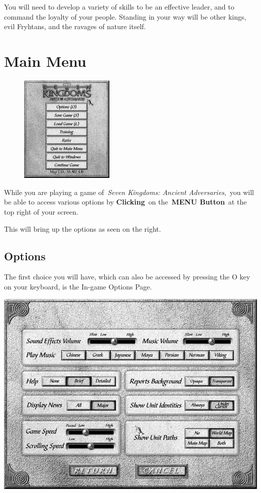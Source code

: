 You will need to develop a variety of skills to be an effective leader, and to command the loyalty of your people. Standing in your way will be other kings, evil Fryhtans, and the ravages of nature itself.

\section{Main Menu}

\begin{figure}
	\begin{center}
		\vspace{-20pt}
		\includegraphics[width=0.4\textwidth]{Imainmenu}
	\end{center}
	\vspace{-20pt}
\end{figure}

While you are playing a game of \textit{Seven Kingdoms: Ancient Adversaries}, you will be able to access various options by \textbf{Clicking} on the \textbf{MENU Button} at the top right of your screen.

This will bring up the options as seen on the right.

\clearpage %

\subsection{Options}

The first choice you will have, which can also be accessed by pressing the O key on your keyboard, is the In-game Options Page.

\begin{center}
	\includegraphics[width=0.7\linewidth]{Ioptions}
\end{center}

